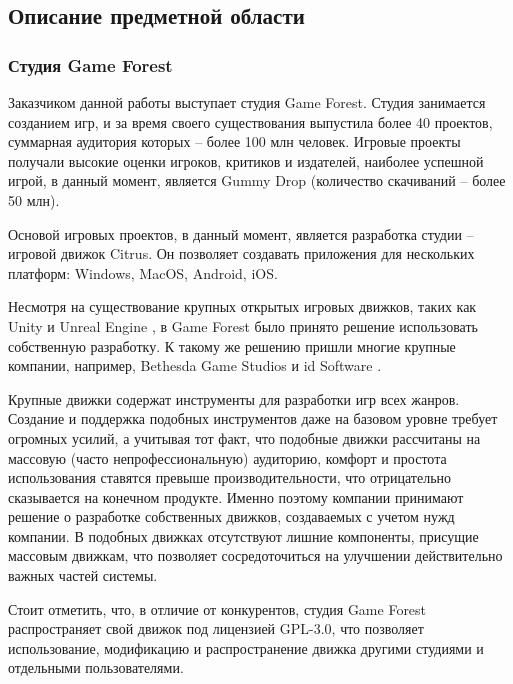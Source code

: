 \documentclass{fefu}
\begin{document}
		\subsection{Описание предметной области}
			\subsubsection{Студия Game Forest}
				\par Заказчиком данной работы выступает студия Game Forest. \cite{GFPortal} 
				Студия занимается созданием игр, и за время своего существования выпустила 
				более 40 проектов, суммарная аудитория которых -- более 100 млн человек. 
				Игровые проекты получали высокие оценки игроков, критиков и издателей, наиболее 
				успешной игрой, в данный момент, является Gummy Drop (количество скачиваний -- 
				более 50 млн)\cite{GummyDropPage}.
				\par Основой игровых проектов, в данный момент, является разработка студии -- 
				игровой движок Citrus. Он позволяет создавать приложения для нескольких
				платформ: Windows, MacOS, Android, iOS.
				\par Несмотря на существование крупных открытых игровых движков, таких как 
				Unity \cite{UnitySite} и Unreal Engine \cite{UnrealEngineSite}, 
				в Game Forest было принято решение использовать собственную разработку. К 
				такому же решению пришли многие крупные компании, например, Bethesda Game 
				Studios \cite{BethesdaEngine} и id Software \cite{idSoftwareEngine}.
				\par Крупные движки содержат инструменты для разработки игр всех жанров. 
				Создание и поддержка подобных инструментов даже на базовом уровне требует 
				огромных усилий, а учитывая тот факт, что подобные движки рассчитаны
				на массовую (часто непрофессиональную) аудиторию, комфорт и простота
				использования ставятся превыше производительности, что отрицательно сказывается
				на конечном продукте. Именно поэтому компании принимают решение о разработке
				собственных движков, создаваемых с учетом нужд компании. В подобных движках
				отсутствуют лишние компоненты, присущие массовым движкам, что позволяет
				сосредоточиться на улучшении действительно важных частей системы.
				\par Стоит отметить, что, в отличие от конкурентов, студия Game
				Forest распространяет свой движок под лицензией GPL-3.0, что позволяет
				использование, модификацию и распространение движка другими студиями и
				отдельными пользователями.
\end{document}
